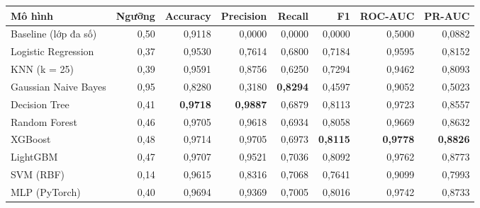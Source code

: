 \begin{tabular}{lrrrrrrr}
\toprule
Mô hình & Ngưỡng & Accuracy & Precision & Recall & F1 & ROC-AUC & PR-AUC \\
\midrule
Baseline (lớp đa số) & 0{,}50 & 0{,}9118 & 0{,}0000 & 0{,}0000 & 0{,}0000 & 0{,}5000 & 0{,}0882 \\
Logistic Regression & 0{,}37 & 0{,}9530 & 0{,}7614 & 0{,}6800 & 0{,}7184 & 0{,}9595 & 0{,}8152 \\
KNN (k = 25) & 0{,}39 & 0{,}9591 & 0{,}8756 & 0{,}6250 & 0{,}7294 & 0{,}9462 & 0{,}8093 \\
Gaussian Naive Bayes & 0{,}95 & 0{,}8280 & 0{,}3180 & \textbf{0{,}8294} & 0{,}4597 & 0{,}9052 & 0{,}5023 \\
Decision Tree & 0{,}41 & \textbf{0{,}9718} & \textbf{0{,}9887} & 0{,}6879 & 0{,}8113 & 0{,}9723 & 0{,}8557 \\
Random Forest & 0{,}46 & 0{,}9705 & 0{,}9618 & 0{,}6934 & 0{,}8058 & 0{,}9669 & 0{,}8632 \\
XGBoost & 0{,}48 & 0{,}9714 & 0{,}9705 & 0{,}6973 & \textbf{0{,}8115} & \textbf{0{,}9778} & \textbf{0{,}8826} \\
LightGBM & 0{,}47 & 0{,}9707 & 0{,}9521 & 0{,}7036 & 0{,}8092 & 0{,}9762 & 0{,}8773 \\
SVM (RBF) & 0{,}14 & 0{,}9615 & 0{,}8316 & 0{,}7068 & 0{,}7641 & 0{,}9099 & 0{,}7993 \\
MLP (PyTorch) & 0{,}40 & 0{,}9694 & 0{,}9369 & 0{,}7005 & 0{,}8016 & 0{,}9742 & 0{,}8733 \\
\bottomrule
\end{tabular}
